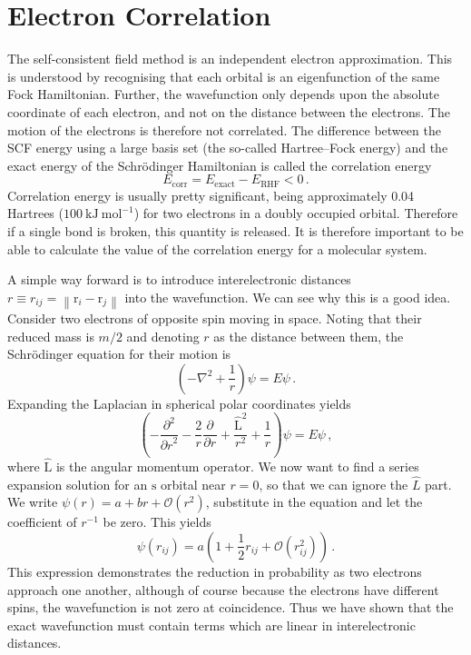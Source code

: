 \documentclass{article}
\theoremstyle{plain}\theoremheaderfont{\normalfont\itshape}\theorembodyfont{\rmfamily}\theoremseparator{.}\newtheorem*{rem}{Remark}\newtheorem*{ex}{Example}\newtheorem*{proof}{Proof}\newtheorem*{altp}{Alternative proof}
\theoremstyle{plain}\theoremheaderfont{\normalfont\bfseries}\theorembodyfont{\rmfamily}\theoremseparator{.}\newtheorem{thm}{Theorem}[section]\newtheorem{lem}[thm]{Lemma}\newtheorem{prop}[thm]{Proposition}\newtheorem*{cor}{Corollary}\newtheorem{defn}[thm]{Definition}\newtheorem{clm}[thm]{Claim}\newtheorem{clminproof}{Claim}
\theoremstyle{break}\theoremheaderfont{\normalfont\itshape}\theorembodyfont{\rmfamily}\theoremseparator{.\medskip}\newtheorem*{proofskip}{Proof}\newtheorem*{exs}{Examples}\newtheorem*{rems}{Remarks}
\theoremstyle{break}\theoremheaderfont{\normalfont\bfseries}\theorembodyfont{\rmfamily}\theoremseparator{.\medskip}\newtheorem{lemskip}[thm]{Lemma}\newtheorem{defnskip}[thm]{Definition}\newtheorem{propskip}[thm]{Proposition}\newtheorem{thmskip}[thm]{Theorem}
\numberwithin{equation}{section}
\newcommand{\unit}[1]{\ \mathrm{#1}}
\newcommand{\pdv}[3][]{\frac{\partial^{#1} #2}{{\partial #3}^{#1}}}
\newcommand{\vb}[1]{\bm{\mathrm{#1}}}
\newcommand{\norm}[1]{\left\| #1 \right\|}
\newcommand{\laplacian}{\nabla^2}
\begin{document}
    \newpage
    \section{Electron Correlation}
    The self-consistent field method is an independent electron approximation. This is understood by recognising that each orbital is an eigenfunction of the same Fock Hamiltonian. Further, the wavefunction only depends upon the absolute coordinate of each electron, and not on the distance between the electrons. The motion of the electrons is therefore not correlated. The difference between the SCF energy using a large basis set (the so-called Hartree--Fock energy) and the exact energy of the Schr\"{o}dinger Hamiltonian is called the correlation energy
    \begin{equation}
        E_{\text{corr}}=E_{\text{exact}}-E_{\text{RHF}}<0\,.
    \end{equation}
    Correlation energy is usually pretty significant, being approximately 0.04 Hartrees (\(100\unit{kJ}\unit{mol}^{-1}\)) for two electrons in a doubly occupied orbital. Therefore if a single bond is broken, this quantity is released. It is therefore important to be able to calculate the value of the correlation energy for a molecular system.

    A simple way forward is to introduce interelectronic distances \(r\equiv r_{ij}=\norm{\vb{r}_i-\vb{r}_j}\) into the wavefunction. We can see why this is a good idea. Consider two electrons of opposite spin moving in space. Noting that their reduced mass is \(m/2\) and denoting \(r\) as the distance between them, the Schr\"{o}dinger equation for their motion is
    \begin{equation}
        \left(-\laplacian+\frac{1}{r}\right)\psi=E\psi\,.
    \end{equation}
    Expanding the Laplacian in spherical polar coordinates yields
    \begin{equation}
        \left(-\pdv[2]{}{r}-\frac{2}{r}\pdv{}{r}+\frac{\hat{\vb{L}}^2}{r^2}+\frac{1}{r}\right)\psi=E\psi\,,
    \end{equation}
    where \(\hat{\vb{L}}\) is the angular momentum operator. We now want to find a series expansion solution for an \(\mathrm{s}\) orbital near \(r=0\), so that we can ignore the \(\hat{L}\) part. We write \(\psi(r)=a+br+\mathcal{O}(r^2)\), substitute in the equation and let the coefficient of \(r^{-1}\) be zero. This yields
    \begin{equation}
        \psi(r_{ij})=a\left(1+\frac{1}{2}r_{ij}+\mathcal{O}(r_{ij}^2)\right)\,.
    \end{equation}
    This expression demonstrates the reduction in probability as two electrons approach one another, although of course because the electrons have different spins, the wavefunction is not zero at coincidence. Thus we have shown that the exact wavefunction must contain terms which are linear in interelectronic distances.
    
\end{document}
